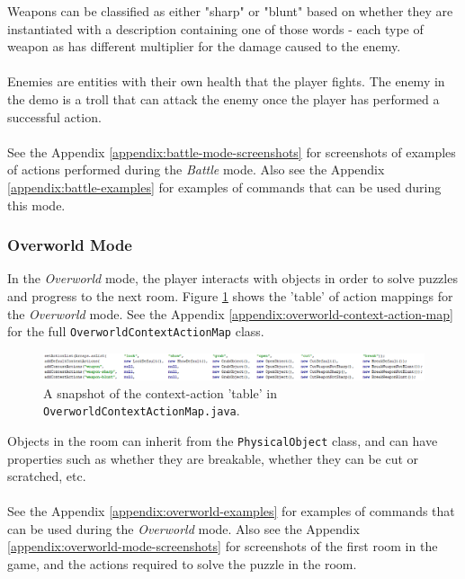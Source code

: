 \documentclass[11pt]{article}
\begin{document}
Weapons can be classified as either "sharp" or "blunt" based on whether they are instantiated with a description containing one of those words - each type of weapon as has different multiplier for the damage caused to the enemy.
\\
\\
Enemies are entities with their own health that the player fights. The enemy in the demo is a troll that can attack the enemy once the player has performed a successful action.
\\
\\
See the Appendix \ref{appendix:battle-mode-screenshots} for screenshots of examples of actions performed during the \textit{Battle} mode. Also see the Appendix \ref{appendix:battle-examples} for examples of commands that can be used during this mode.

\subsubsection{Overworld Mode}

In the \textit{Overworld} mode, the player interacts with objects in order to solve puzzles and progress to the next room. Figure \ref{fig:overworld-context-action-map} shows the 'table' of action mappings for the \textit{Overworld} mode. See the Appendix \ref{appendix:overworld-context-action-map} for the full \texttt{OverworldContextActionMap} class.

\begin{center}
\begin{figure}[H]
\begin{center}
  \includegraphics[width=\linewidth]{overworld-context-action-map.png}
  \caption{A snapshot of the context-action 'table' in \texttt{OverworldContextActionMap.java}.}
  \label{fig:overworld-context-action-map}
  \end{center}
\end{figure}
\end{center}

Objects in the room can inherit from the \texttt{PhysicalObject} class, and can have properties such as whether they are breakable, whether they can be cut or scratched, etc.
\\
\\
See the Appendix \ref{appendix:overworld-examples} for examples of commands that can be used during the \textit{Overworld} mode. Also see the Appendix \ref{appendix:overworld-mode-screenshots} for screenshots of the first room in the game, and the actions required to solve the puzzle in the room.
\end{document}

